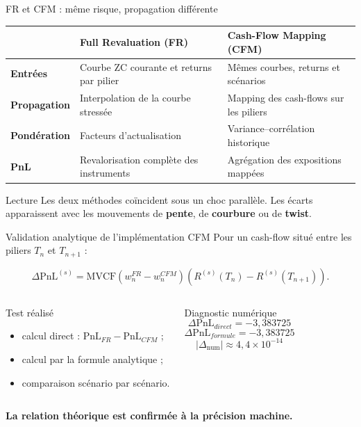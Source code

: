 \documentclass[10pt,aspectratio=169]{beamer}
\newcommand{\keyword}[1]{\textcolor{AccentBlue}{\textbf{#1}}}
\newcommand{\done}{\textcolor{SuccessGreen}{\ding{51}}}
\begin{document}
\begin{frame}{FR et CFM : même risque, propagation différente}
  \renewcommand{\arraystretch}{1.35}
  \centering
  \begin{tabular}{>{\bfseries}p{2.7cm}p{4.5cm}p{4.5cm}}
    \toprule
    & Full Revaluation (FR) & Cash-Flow Mapping (CFM) \\
    \midrule
    Entrées
      & Courbe ZC courante et returns par pilier
      & Mêmes courbes, returns et scénarios \\
    Propagation
      & Interpolation de la courbe stressée
      & Mapping des cash-flows sur les piliers \\
    Pondération
      & Facteurs d'actualisation
      & Variance--corrélation historique \\
    PnL
      & Revalorisation complète des instruments
      & Agrégation des expositions mappées \\
    \bottomrule
  \end{tabular}

  \vspace{0.45cm}
  \begin{block}{Lecture}
    Les deux méthodes coïncident sous un choc parallèle. Les écarts
    apparaissent avec les mouvements de \keyword{pente}, de
    \keyword{courbure} ou de \keyword{twist}.
  \end{block}
\end{frame}

\begin{frame}{Validation analytique de l'implémentation CFM}
  Pour un cash-flow situé entre les piliers $T_n$ et $T_{n+1}$ :

  \[
    \Delta \mathrm{PnL}^{(s)}
    =
    \mathrm{MVCF}
    \left(w_n^{FR}-w_n^{CFM}\right)
    \left(R^{(s)}(T_n)-R^{(s)}(T_{n+1})\right).
  \]

  \begin{columns}[T,onlytextwidth]
    \begin{block}{Test réalisé}
      \begin{itemize}
        \item calcul direct : $\mathrm{PnL}_{FR}-\mathrm{PnL}_{CFM}$ ;
        \item calcul par la formule analytique ;
        \item comparaison scénario par scénario.
      \end{itemize}
    \end{block}

    \begin{block}{Diagnostic numérique}
      \[
        \Delta \mathrm{PnL}_{direct}=-3{,}383725
      \]
      \[
        \Delta \mathrm{PnL}_{formule}=-3{,}383725
      \]
      \[
        \left|\Delta_{\mathrm{num}}\right|\approx 4{,}4\times10^{-14}
      \]
    \end{block}
  \end{columns}

  \centering
  \done\quad \textbf{La relation théorique est confirmée à la précision machine.}
\end{frame}
\end{document}
